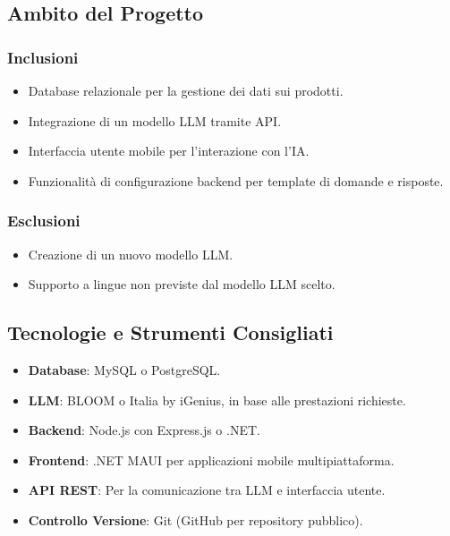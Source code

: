 \documentclass{article}
\begin{document}
    \subsection{Ambito del Progetto}
        \subsubsection{Inclusioni}
        \begin{itemize}
            \item Database relazionale per la gestione dei dati sui prodotti.
            \item Integrazione di un modello LLM tramite API.
            \item Interfaccia utente mobile per l'interazione con l'IA.
            \item Funzionalità di configurazione backend per template di domande e risposte.
        \end{itemize}
        \subsubsection{Esclusioni}
        \begin{itemize}
            \item Creazione di un nuovo modello LLM.
            \item Supporto a lingue non previste dal modello LLM scelto.
        \end{itemize}

    \subsection{Tecnologie e Strumenti Consigliati}
    \begin{itemize}
        \item \textbf{Database}: MySQL o PostgreSQL.
        \item \textbf{LLM}: BLOOM o Italia by iGenius, in base alle prestazioni richieste.
        \item \textbf{Backend}: Node.js con Express.js o .NET.
        \item \textbf{Frontend}: .NET MAUI per applicazioni mobile multipiattaforma.
        \item \textbf{API REST}: Per la comunicazione tra LLM e interfaccia utente.
        \item \textbf{Controllo Versione}: Git (GitHub per repository pubblico).
    \end{itemize}
\end{document}

